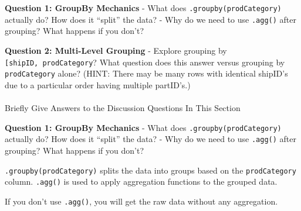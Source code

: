 \documentclass[
]{article}
\makeatletter
\let\oldparagraph\paragraph
\renewcommand{\paragraph}{
    \@ifstar
      \xxxParagraphStar
      \xxxParagraphNoStar
  }
\newcommand{\xxxParagraphStar}[1]{\oldparagraph*{#1}\mbox{}}
\newcommand{\xxxParagraphNoStar}[1]{\oldparagraph{#1}\mbox{}}
\makeatother
\begin{document}
\begin{tcolorbox}[enhanced jigsaw, colbacktitle=quarto-callout-important-color!10!white, toptitle=1mm, colframe=quarto-callout-important-color-frame, bottomtitle=1mm, colback=white, left=2mm, breakable, coltitle=black, bottomrule=.15mm, rightrule=.15mm, titlerule=0mm, opacityback=0, title=\textcolor{quarto-callout-important-color}{\faExclamation}\hspace{0.5em}{🤔 Discussion Questions: Split-Apply-Combine Mental Model}, arc=.35mm, opacitybacktitle=0.6, toprule=.15mm, leftrule=.75mm]

\textbf{Question 1: GroupBy Mechanics} - What does
\texttt{.groupby(\textquotesingle{}prodCategory\textquotesingle{})}
actually do? How does it ``split'' the data? - Why do we need to use
\texttt{.agg()} after grouping? What happens if you don't?

\textbf{Question 2: Multi-Level Grouping} - Explore grouping by
\texttt{{[}\textquotesingle{}shipID\textquotesingle{},\ \textquotesingle{}prodCategory\textquotesingle{}{]}}?
What question does this answer versus grouping by
\texttt{\textquotesingle{}prodCategory\textquotesingle{}} alone? (HINT:
There may be many rows with identical shipID's due to a particular order
having multiple partID's.)

\end{tcolorbox}

\paragraph{Briefly Give Answers to the Discussion Questions In This
Section}\label{briefly-give-answers-to-the-discussion-questions-in-this-section-6}

\textbf{Question 1: GroupBy Mechanics} - What does
\texttt{.groupby(\textquotesingle{}prodCategory\textquotesingle{})}
actually do? How does it ``split'' the data? - Why do we need to use
\texttt{.agg()} after grouping? What happens if you don't?

\texttt{.groupby(\textquotesingle{}prodCategory\textquotesingle{})}
splits the data into groups based on the \texttt{prodCategory} column.
\texttt{.agg()} is used to apply aggregation functions to the grouped
data.

If you don't use \texttt{.agg()}, you will get the raw data without any
aggregation.
\end{document}
